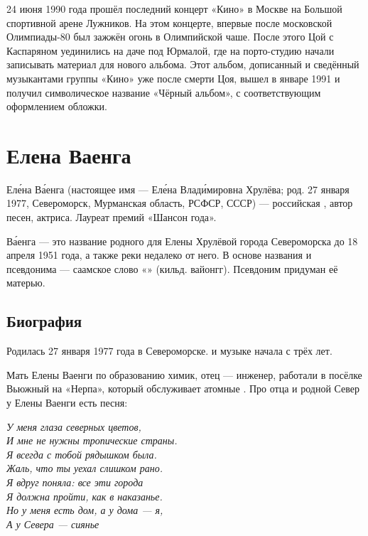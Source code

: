24 июня 1990 года прошёл последний концерт «Кино» в Москве на Большой спортивной арене Лужников. На этом концерте, впервые после московской Олимпиады-80 был зажжён огонь в Олимпийской чаше. После этого Цой с Каспаряном уединились на даче под Юрмалой, где на порто-студию начали записывать материал для нового альбома. Этот альбом, дописанный и сведённый музыкантами группы «Кино» уже после смерти Цоя, вышел в январе 1991 и получил символическое название «Чёрный альбом», с соответствующим оформлением обложки.

\section{Елена Ваенга}
Ел\'{е}на В\'{а}енга (настоящее имя --- Ел\'{е}на Влад\'{и}мировна Хрулёва; род. 27 января 1977, Североморск, Мурманская область, РСФСР, СССР) --- российская , автор песен, актриса. Лауреат премий «Шансон года».

В\'{а}енга --- это название родного для Елены Хрулёвой города Североморска до 18 апреля 1951 года, а также реки недалеко от него. В основе названия и псевдонима --- саамское слово «» (кильд. вайонгг). Псевдоним придуман её матерью.

\subsection{Биография}
Родилась 27 января 1977 года в Североморске.  и  музыке начала с трёх лет.

Мать Елены Ваенги по образованию химик, отец --- инженер, работали в посёлке Вьюжный на  «Нерпа», который обслуживает атомные . Про отца и родной Север у Елены Ваенги есть песня:

\begin{fancyquotes}
    {\it У меня глаза северных цветов,\\
        И мне не нужны тропические страны.\\
        Я всегда с тобой рядышком была.\\
        Жаль, что ты уехал слишком рано.\\
        Я вдруг поняла: все эти города\\
        Я должна пройти, как в наказанье.\\
        Но у меня есть дом, а у дома --- я,\\
        А у Севера --- сиянье}
\end{fancyquotes}


